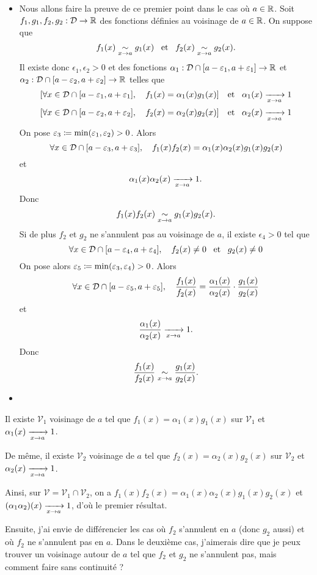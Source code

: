 \documentclass{magnolia}
\begin{document}
\begin{preuve}
\begin{francois}
\begin{itemize}
\item Nous allons faire la preuve de ce premier point dans le cas où $a\in\mathbb{R}$. Soit $f_1,g_1,f_2,g_2:\mathcal{D}\to\mathbb{R}$ des fonctions définies au voisinage de $a\in\mathbb{R}$. On suppose que
\[f_1(x)\underset{x\rightarrow a}{\sim} g_1(x) \quad\!\text{et}\quad\! f_2(x)\underset{x\rightarrow a}{\sim} g_2(x).\]
Il existe donc $\epsilon_1,\epsilon_2>0$ et des fonctions $\alpha_1:\mathcal{D}\cap[a-\varepsilon_1,a+\varepsilon_1]\to\mathbb{R}$ et $\alpha_2:\mathcal{D}\cap[a-\varepsilon_2,a+\varepsilon_2]\to\mathbb{R}$ telles que
\[\left[\forall x\in\mathcal{D}\cap[a-\varepsilon_1,a+\varepsilon_1],\quad f_1(x)=\alpha_1(x)g_1(x)\right] \quad\!\text{et}\quad\!
  \alpha_1(x)\xrightarrow[x\rightarrow a]{}1\]
\[\left[\forall x\in\mathcal{D}\cap[a-\varepsilon_2,a+\varepsilon_2],\quad f_2(x)=\alpha_2(x)g_2(x)\right] \quad\!\text{et}\quad\!
  \alpha_2(x)\xrightarrow[x\rightarrow a]{}1\]
On pose $\varepsilon_3\coloneqq \min(\varepsilon_1,\varepsilon_2)> 0$. Alors
\[\forall x\in\mathcal{D}\cap[a-\varepsilon_3,a+\varepsilon_3],\quad f_1(x)f_2(x)=\alpha_1(x)\alpha_2(x)g_1(x)g_2(x)\]
et
\[\alpha_1(x)\alpha_2(x)\xrightarrow[x\rightarrow a]{}1.\]
Donc
\[f_1(x)f_2(x) \underset{x\rightarrow a}{\sim} g_1(x)g_2(x).\]
Si de plus $f_2$ et $g_2$ ne s'annulent pas au voisinage de $a$, il existe $\epsilon_4>0$ tel que
\[\forall x\in\mathcal{D}\cap[a-\varepsilon_4,a+\varepsilon_4],\quad f_2(x)\neq 0 \quad\!\text{et}\quad\! g_2(x)\neq 0\]
On pose alors $\varepsilon_5\coloneqq\min(\varepsilon_3,\varepsilon_4)>0$. Alors
\[\forall x\in\mathcal{D}\cap[a-\varepsilon_5,a+\varepsilon_5],\quad \frac{f_1(x)}{f_2(x)}=\frac{\alpha_1(x)}{\alpha_2(x)}\cdot\frac{g_1(x)}{g_2(x)}\]
et 
\[\frac{\alpha_1(x)}{\alpha_2(x)}\xrightarrow[x\rightarrow a]{}1.\]
Donc
\[\frac{f_1(x)}{f_2(x)} \underset{x\rightarrow a}{\sim} \frac{g_1(x)}{g_2(x)}.\]
\item 
\end{itemize}
\end{francois}
\begin{victor}
Il existe $\mathcal{V}_1$ voisinage de $a$ tel que $f_1(x)=\alpha_1(x)g_1(x)$ sur $\mathcal{V}_1$ et $\alpha_1(x)\xrightarrow[x\rightarrow a]{}1$.

De même, il existe $\mathcal{V}_2$ voisinage de $a$ tel que $f_2(x)=\alpha_2(x)g_2(x)$ sur $\mathcal{V}_2$ et $\alpha_2(x)\xrightarrow[x\rightarrow a]{}1$.

Ainsi, sur $\mathcal{V}=\mathcal{V}_1\cap \mathcal{V}_2$, on a $f_1(x)f_2(x)=\alpha_1(x)\alpha_2(x)g_1(x)g_2(x)$ et $(\alpha_1\alpha_2)(x)\xrightarrow[x\rightarrow a]{}1$, d'où le premier résultat.

Ensuite, j'ai envie de différencier les cas où $f_2$ s'annulent en $a$ (donc $g_2$ aussi) et où $f_2$ ne s'annulent pas en $a$. Dans le deuxième cas, j'aimerais dire que je peux trouver un voisinage autour de $a$ tel que $f_2$ et $g_2$ ne s'annulent pas, mais comment faire sans continuité ?
\end{victor}
\end{preuve}
\end{document}
